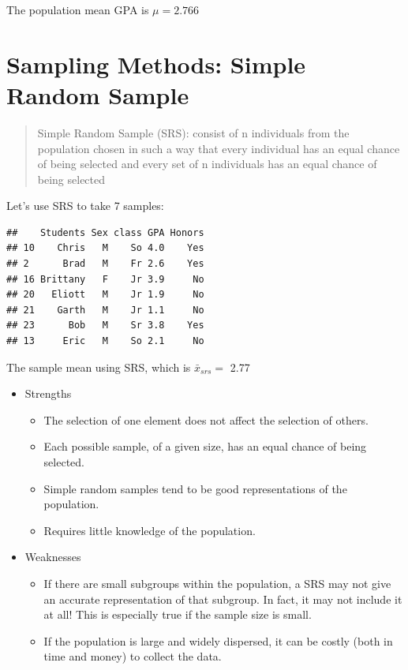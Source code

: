 \documentclass[]{book}
\providecommand{\tightlist}{%
  \setlength{\itemsep}{0pt}\setlength{\parskip}{0pt}}
\begin{document}
The population mean GPA is \(\mu=2.766\)

\hypertarget{sampling-methods-simple-random-sample}{%
\section{Sampling Methods: Simple Random Sample}\label{sampling-methods-simple-random-sample}}

\begin{quote}
Simple Random Sample (SRS): consist of n individuals from the population chosen in such a way that every individual has an equal chance of being selected and every set of n individuals has an equal chance of being selected
\end{quote}

Let's use SRS to take 7 samples:

\begin{verbatim}
##    Students Sex class GPA Honors
## 10    Chris   M    So 4.0    Yes
## 2      Brad   M    Fr 2.6    Yes
## 16 Brittany   F    Jr 3.9     No
## 20   Eliott   M    Jr 1.9     No
## 21    Garth   M    Jr 1.1     No
## 23      Bob   M    Sr 3.8    Yes
## 13     Eric   M    So 2.1     No
\end{verbatim}

The sample mean using SRS, which is \(\bar{x}_{srs}=\) 2.77

\begin{itemize}
\tightlist
\item
  Strengths

  \begin{itemize}
  \tightlist
  \item
    The selection of one element does not affect the selection of others.\\
  \item
    Each possible sample, of a given size, has an equal chance of being selected.\\
  \item
    Simple random samples tend to be good representations of the population.\\
  \item
    Requires little knowledge of the population.\\
  \end{itemize}
\item
  Weaknesses

  \begin{itemize}
  \tightlist
  \item
    If there are small subgroups within the population, a SRS may not give an accurate representation of that subgroup. In fact, it may not include it at all! This is especially true if the sample size is small.\\
  \item
    If the population is large and widely dispersed, it can be costly (both in time and money) to collect the data.
  \end{itemize}
\end{itemize}
\end{document}
